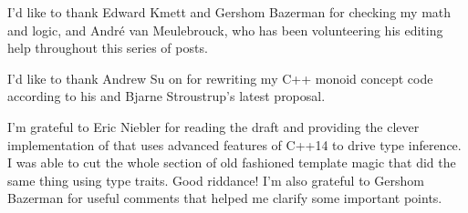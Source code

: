 \noindent
I’d like to thank Edward Kmett and Gershom Bazerman for checking my math
and logic, and André van Meulebrouck, who has been volunteering his editing
help throughout this series of posts.

\vspace{1.0em}
\noindent
I’d like to thank Andrew Su on for rewriting my C++ monoid concept
code according to his and Bjarne Stroustrup’s latest proposal.

\vspace{1.0em}
\noindent
I'm grateful to Eric Niebler for reading the draft and providing the
clever implementation of  that uses advanced features of
C++14 to drive type inference. I was able to cut the whole section of
old fashioned template magic that did the same thing using type traits.
Good riddance! I'm also grateful to Gershom Bazerman for useful comments
that helped me clarify some important points.